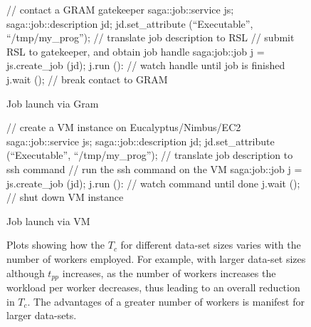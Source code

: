 \documentclass[conference,final]{IEEEtran}
\newcommand{\tc }{ $T_c$ }
\newcommand{\upp}{\vspace*{-0.5em}}
\begin{document}
\begin{figure}[!ht]
\upp
 \begin{center}
  \begin{mycode}[label=SAGA Job Launch via GRAM gatekeeper]
   { // contact a GRAM gatekeeper
    saga::job::service     js;
    saga::job::description jd;
    jd.set_attribute (``Executable'', ``/tmp/my_prog'');
    // translate job description to RSL
    // submit RSL to gatekeeper, and obtain job handle
    saga:job::job j = js.create_job (jd);
    j.run ():
    // watch handle until job is finished
    j.wait ();
   } // break contact to GRAM
  \end{mycode}
  \caption{\label{gramjob}Job launch via Gram }
 \end{center}
\upp
\end{figure}

\begin{figure}[!ht]
\upp
 \begin{center}
  \begin{mycode}[label=SAGA create a VM instance on a Cloud]
   {// create a VM instance on Eucalyptus/Nimbus/EC2
    saga::job::service     js;
    saga::job::description jd;
    jd.set_attribute (``Executable'', ``/tmp/my_prog'');
    // translate job description to ssh command
    // run the ssh command on the VM
    saga:job::job j = js.create_job (jd);
    j.run ():
    // watch command until done
    j.wait ();
   } // shut down VM instance
  \end{mycode}
  \caption{\label{vmjob} Job launch via VM}
 \end{center}
\upp
\end{figure}

\begin{figure}[t]
  \caption{Plots showing how the \tc for different data-set sizes
    varies with the number of workers employed.  For example, with
    larger data-set sizes although $t_{pp}$ increases, as the number
    of workers increases the workload per worker decreases, thus
    leading to an overall reduction in $T_c$. The advantages of a
    greater number of workers is manifest for larger data-sets.}
\label{grids1}
\end{figure}
\end{document}
